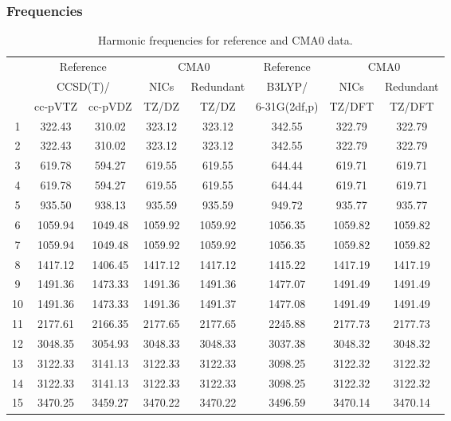 \documentclass[10pt,oneside]{article}
\begin{document}
\begin{table}[h!]
\subsubsection*{Frequencies}
\centering
\caption{Harmonic frequencies for reference and CMA0 data.}
\begin{tabular}{cccccccc}
\toprule
{} & \multicolumn{2}{c}{Reference} & \multicolumn{2}{c}{CMA0} &    Reference & \multicolumn{2}{c}{CMA0} \\
{} & \multicolumn{2}{c}{CCSD(T)/} &    NICs &  Redundant &       B3LYP/ &    NICs & Redundant \\
{} &   cc-pVTZ & cc-pVDZ &   TZ/DZ &      TZ/DZ & 6-31G(2df,p) &  TZ/DFT &    TZ/DFT \\
\midrule
1  &    322.43 &  310.02 &  323.12 &     323.12 &       342.55 &  322.79 &    322.79 \\
2  &    322.43 &  310.02 &  323.12 &     323.12 &       342.55 &  322.79 &    322.79 \\
3  &    619.78 &  594.27 &  619.55 &     619.55 &       644.44 &  619.71 &    619.71 \\
4  &    619.78 &  594.27 &  619.55 &     619.55 &       644.44 &  619.71 &    619.71 \\
5  &    935.50 &  938.13 &  935.59 &     935.59 &       949.72 &  935.77 &    935.77 \\
6  &   1059.94 & 1049.48 & 1059.92 &    1059.92 &      1056.35 & 1059.82 &   1059.82 \\
7  &   1059.94 & 1049.48 & 1059.92 &    1059.92 &      1056.35 & 1059.82 &   1059.82 \\
8  &   1417.12 & 1406.45 & 1417.12 &    1417.12 &      1415.22 & 1417.19 &   1417.19 \\
9  &   1491.36 & 1473.33 & 1491.36 &    1491.36 &      1477.07 & 1491.49 &   1491.49 \\
10 &   1491.36 & 1473.33 & 1491.36 &    1491.37 &      1477.08 & 1491.49 &   1491.49 \\
11 &   2177.61 & 2166.35 & 2177.65 &    2177.65 &      2245.88 & 2177.73 &   2177.73 \\
12 &   3048.35 & 3054.93 & 3048.33 &    3048.33 &      3037.38 & 3048.32 &   3048.32 \\
13 &   3122.33 & 3141.13 & 3122.33 &    3122.33 &      3098.25 & 3122.32 &   3122.32 \\
14 &   3122.33 & 3141.13 & 3122.33 &    3122.33 &      3098.25 & 3122.32 &   3122.32 \\
15 &   3470.25 & 3459.27 & 3470.22 &    3470.22 &      3496.59 & 3470.14 &   3470.14 \\
\bottomrule
\end{tabular}
\end{table}
\end{document}
